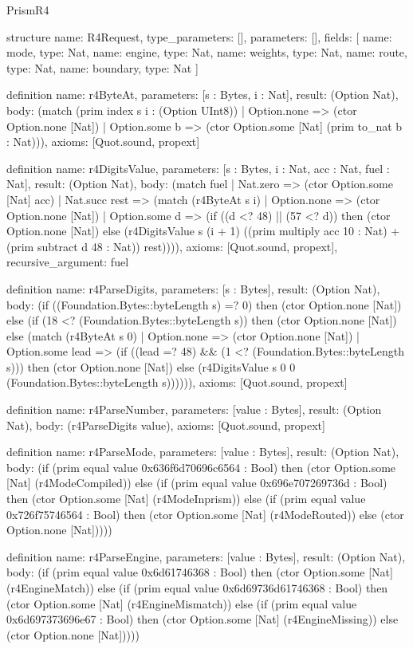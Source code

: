 \begin{lexlean}{PrismR4}
\begin{semanticmodule}
structure{
  name: R4Request,
  type_parameters: [],
  parameters: [],
  fields: [
    {name: mode, type: Nat},
    {name: engine, type: Nat},
    {name: weights, type: Nat},
    {name: route, type: Nat},
    {name: boundary, type: Nat}
  ]
}

definition{
  name: r4ByteAt,
  parameters: [s : Bytes, i : Nat],
  result: (Option Nat),
  body: (match (prim index s i : (Option UInt8))
    | Option.none => (ctor Option.none [Nat])
    | Option.some b => (ctor Option.some [Nat] (prim to_nat b : Nat))),
  axioms: [Quot.sound, propext]
}

definition{
  name: r4DigitsValue,
  parameters: [s : Bytes, i : Nat, acc : Nat, fuel : Nat],
  result: (Option Nat),
  body: (match fuel
    | Nat.zero => (ctor Option.some [Nat] acc)
    | Nat.succ rest => (match (r4ByteAt s i)
      | Option.none => (ctor Option.none [Nat])
      | Option.some d => (if ((d <? 48) || (57 <? d)) then (ctor Option.none [Nat]) else (r4DigitsValue s (i + 1) ((prim multiply acc 10 : Nat) + (prim subtract d 48 : Nat)) rest)))),
  axioms: [Quot.sound, propext],
  recursive_argument: fuel
}

definition{
  name: r4ParseDigits,
  parameters: [s : Bytes],
  result: (Option Nat),
  body: (if ((Foundation.Bytes::byteLength s) =? 0) then (ctor Option.none [Nat]) else (if (18 <? (Foundation.Bytes::byteLength s)) then (ctor Option.none [Nat]) else (match (r4ByteAt s 0)
    | Option.none => (ctor Option.none [Nat])
    | Option.some lead => (if ((lead =? 48) && (1 <? (Foundation.Bytes::byteLength s))) then (ctor Option.none [Nat]) else (r4DigitsValue s 0 0 (Foundation.Bytes::byteLength s)))))),
  axioms: [Quot.sound, propext]
}

definition{
  name: r4ParseNumber,
  parameters: [value : Bytes],
  result: (Option Nat),
  body: (r4ParseDigits value),
  axioms: [Quot.sound, propext]
}

definition{
  name: r4ParseMode,
  parameters: [value : Bytes],
  result: (Option Nat),
  body: (if (prim equal value 0x636f6d70696c6564 : Bool) then (ctor Option.some [Nat] (r4ModeCompiled)) else (if (prim equal value 0x696e707269736d : Bool) then (ctor Option.some [Nat] (r4ModeInprism)) else (if (prim equal value 0x726f75746564 : Bool) then (ctor Option.some [Nat] (r4ModeRouted)) else (ctor Option.none [Nat]))))
}

definition{
  name: r4ParseEngine,
  parameters: [value : Bytes],
  result: (Option Nat),
  body: (if (prim equal value 0x6d61746368 : Bool) then (ctor Option.some [Nat] (r4EngineMatch)) else (if (prim equal value 0x6d69736d61746368 : Bool) then (ctor Option.some [Nat] (r4EngineMismatch)) else (if (prim equal value 0x6d697373696e67 : Bool) then (ctor Option.some [Nat] (r4EngineMissing)) else (ctor Option.none [Nat]))))
}


\end{semanticmodule}
\end{lexlean}
